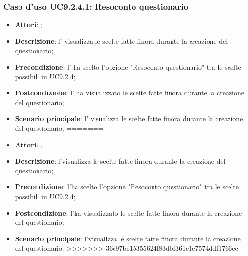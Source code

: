 			\subsubsection{Caso d'uso UC9.2.4.1: Resoconto questionario}
			\label{UC9.2.4.1}
			\begin{itemize}
<<<<<<< HEAD
				\item \textbf{Attori}: \uaupro{};
				\item \textbf{Descrizione}: l'\uaupro{} visualizza le scelte fatte finora durante la creazione del questionario;
				\item \textbf{Precondizione}: l'\uaupro{} ha scelto l'opzione "Resoconto questionario" tra le scelte possibili in UC9.2.4;
				\item \textbf{Postcondizione}: l'\uaupro{} ha visualizzato le scelte fatte finora durante la creazione del questionario;
				\item \textbf{Scenario principale}: l'\uaupro{} visualizza le scelte fatte finora durante la creazione del questionario;
=======
				\item \textbf{Attori}: \uaupro;
				\item \textbf{Descrizione}: l'\uaupro visualizza le scelte fatte finora durante la creazione del questionario;
				\item \textbf{Precondizione}: l'\uaupro ha scelto l'opzione "Resoconto questionario" tra le scelte possibili in UC9.2.4;
				\item \textbf{Postcondizione}: l'\uaupro ha visualizzato le scelte fatte finora durante la creazione del questionario;
				\item \textbf{Scenario principale}: l'\uaupro visualizza le scelte fatte finora durante la creazione del questionario.
>>>>>>> 36c97be15355624f83dbf361c1e7574ddf1766cc
			\end{itemize}
			
